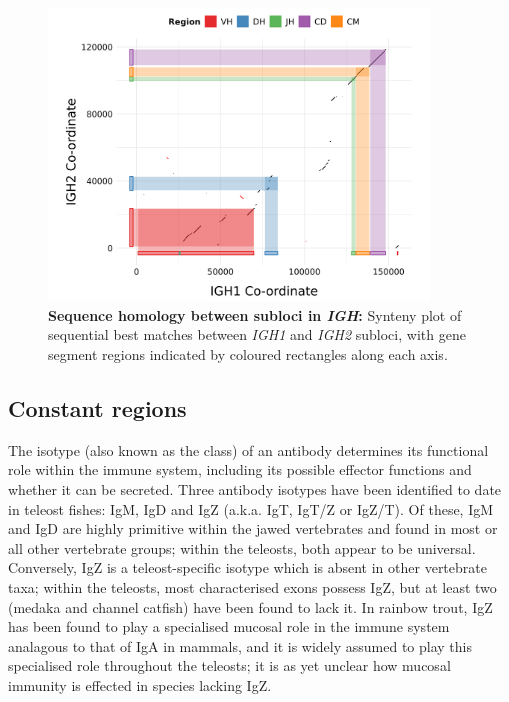 	\begin{figure}
	\centering
	\includegraphics[width=0.9\textwidth]{_Figures/png/nfu-locus-dots.png}
	\caption[Sequence homology between subloci in \Nfu \textit{IGH}]{\textbf{Sequence homology between subloci in \Nfu \textit{IGH}:} Synteny plot of sequential best matches between \textit{IGH1} and \textit{IGH2} subloci, with gene segment regions indicated by coloured rectangles along each axis.}
	\label{fig:nfu-locus-synteny}
	\end{figure}
	
	\subsection{Constant regions}
	\label{sec:nfu-locus-constant}
	
	The isotype (also known as the class) of an antibody determines its functional role within the immune system, including its possible effector functions and whether it can be secreted. Three antibody isotypes have been identified to date in teleost fishes: IgM, IgD and IgZ (a.k.a. IgT, IgT/Z or IgZ/T). Of these, IgM and IgD are highly primitive within the jawed vertebrates and found in most or all other vertebrate groups; within the teleosts, both appear to be universal. Conversely, IgZ is a teleost-specific isotype which is absent in other vertebrate taxa; within the teleosts, most characterised exons possess IgZ, but at least two (medaka and channel catfish) have been found to lack it. In rainbow trout, IgZ has been found to play a specialised mucosal role in the immune system analagous to that of IgA in mammals, and it is widely assumed to play this specialised role throughout the teleosts; it is as yet unclear how mucosal immunity is effected in species lacking IgZ.
	
